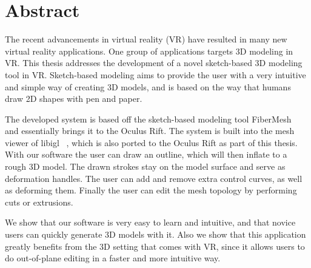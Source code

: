 \chapter*{Abstract}

The recent advancements in virtual reality (VR) have resulted in many new virtual reality applications. One group of applications targets 3D modeling in VR. This thesis addresses the development of a novel sketch-based 3D modeling tool in VR. Sketch-based modeling aims to provide the user with a very intuitive and simple way of creating 3D models, and is based on the way that humans draw 2D shapes with pen and paper. 

The developed system is based off the sketch-based modeling tool FiberMesh~\cite{Nealen2007} and essentially brings it to the Oculus Rift. The system is built into the mesh viewer of libigl ~\cite{Jacobson2017}, which is also ported to the Oculus Rift as part of this thesis. With our software the user can draw an outline, which will then inflate to a rough 3D model. The drawn strokes stay on the model surface and serve as deformation handles. The user can add and remove extra control curves, as well as deforming them. Finally the user can edit the mesh topology by performing cuts or extrusions. 

We show that our software is very easy to learn and intuitive, and that novice users can quickly generate 3D models with it. Also we show that this application greatly benefits from the 3D setting that comes with VR, since it allows users to do out-of-plane editing in a faster and more intuitive way. 


\cleardoublepage
